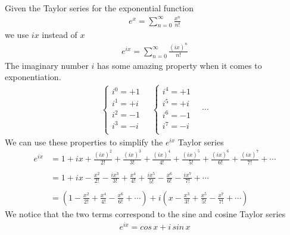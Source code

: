 \documentclass{article}
\begin{document}
Given the Taylor series for the exponential function
\begin{align*}
	e^x=\sum_{n=0}^{\infty}\frac{x^n}{n!}
\end{align*}
we use \(ix\) instead of \(x\)
\begin{align*}
	e^{ix}=\sum_{n=0}^{\infty}\frac{(ix)^n}{n!}
\end{align*}
The imaginary number \(i\) has some amazing property when it comes to exponentiation.
\begin{align*}
	\begin{cases}
		i^0=+1\\
		i^1=+i\\
		i^2=-1\\
		i^3=-i\\
	\end{cases}
	\quad
	\begin{cases}
		i^4=+1\\
		i^5=+i\\
		i^6=-1\\
		i^7=-i\\
	\end{cases}
	\quad
	\cdots
\end{align*}
We can use these properties to simplify the \(e^{ix}\) Taylor series
\begin{align*}
	e^{ix}
	&   =1
		+ix
		+\frac{(ix)^2}{2!}
		+\frac{(ix)^3}{3!}
		+\frac{(ix)^4}{4!}
		+\frac{(ix)^5}{5!}
		+\frac{(ix)^6}{6!}
		+\frac{(ix)^7}{7!}
		+\cdots
	\\
	\\
	&   =1
		+ix
		-\frac{x^2}{2!}
		-\frac{ix^3}{3!}
		+\frac{x^4}{4!}
		+\frac{ix^5}{5!}
		-\frac{x^6}{6!}
		-\frac{ix^7}{7!}
		+\cdots
	\\
	\\
	&=
	\left(
		1
		-\frac{x^2}{2!}
		+\frac{x^4}{4!}
		-\frac{x^6}{6!}
		+\cdots
	\right)
	+i
	\left(
		x
		-\frac{x^3}{3!}
		+\frac{x^5}{5!}
		-\frac{x^7}{7!}
		+\cdots
	\right)
\end{align*}
We notice that the two terms correspond to the sine and cosine Taylor series
\begin{align*}
	e^{ix}=cos\,x+i\,sin\,x
\end{align*}
\end{document}
